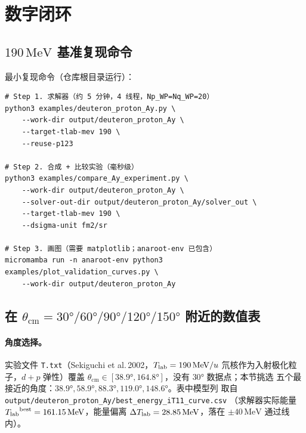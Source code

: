 \section{数字闭环}
\label{sec:ch13-numerical}

\subsection{\(190\,\text{MeV}\) 基准复现命令}
\label{subsec:ch13-reproduce-190}

最小复现命令（仓库根目录运行）：
\begin{lstlisting}[style=config, caption={190 MeV 极化观测量基准的复现脚本},
  label={lst:ch13-reproduce-cmd}]
# Step 1. 求解器（约 5 分钟，4 线程，Np_WP=Nq_WP=20）
python3 examples/deuteron_proton_Ay.py \
    --work-dir output/deuteron_proton_Ay \
    --target-tlab-mev 190 \
    --reuse-p123

# Step 2. 合成 + 比较实验（毫秒级）
python3 examples/compare_Ay_experiment.py \
    --work-dir output/deuteron_proton_Ay \
    --solver-out-dir output/deuteron_proton_Ay/solver_out \
    --target-tlab-mev 190 \
    --dsigma-unit fm2/sr

# Step 3. 画图（需要 matplotlib；anaroot-env 已包含）
micromamba run -n anaroot-env python3 examples/plot_validation_curves.py \
    --work-dir output/deuteron_proton_Ay
\end{lstlisting}

\subsection{在 \(\theta_{\text{cm}} = 30°/60°/90°/120°/150°\) 附近的数值表}
\label{subsec:ch13-numerical-table}

\paragraph{角度选择。}
实验文件 \texttt{T.txt}（Sekiguchi et al.\,2002，\({T_{\text{lab}}} = 190\,\text{MeV}/u\)
氘核作为入射极化粒子，\(d+p\) 弹性）覆盖
\(\theta_{\text{cm}} \in [38.9°, 164.8°]\)，没有 \(30°\) 数据点；本节挑选
五个最接近的角度：\(38.9°, 58.9°, 88.3°, 119.0°, 148.6°\)。表中模型列
取自 \texttt{output/deuteron\_proton\_Ay/best\_energy\_iT11\_curve.csv}
（求解器实际能量
\({T_{\text{lab}}}^{\text{best}} = 161.15\,\text{MeV}\)，能量偏离
\(\Delta{T_{\text{lab}}} = 28.85\,\text{MeV}\)，落在 \(\pm 40\,\text{MeV}\) 通过线
内）。

